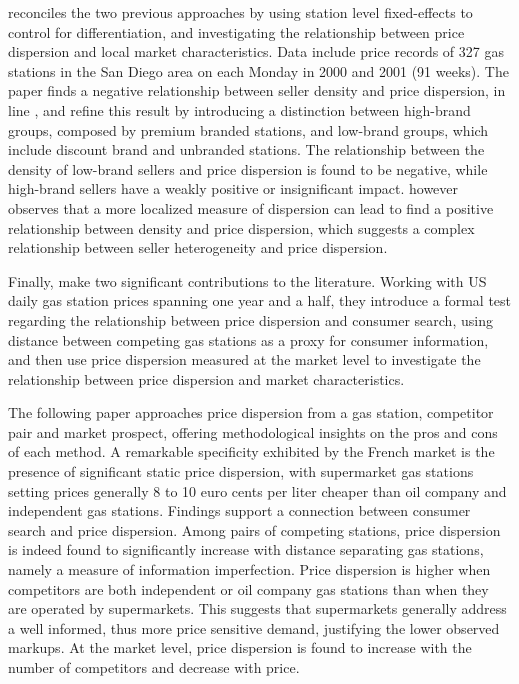 \documentclass[english]{article}
\begin{document}
\cite{LEW08} reconciles the two previous approaches by using station level fixed-effects to control for differentiation, and investigating the relationship between price dispersion and local market characteristics. Data include price records of 327 gas stations in the San Diego area on each Monday in 2000 and 2001 (91 weeks). The paper finds a negative relationship between seller density and price dispersion, in line \cite{BAR04}, and refine this result by introducing a distinction between high-brand groups, composed by premium branded stations, and low-brand groups, which include discount brand and unbranded stations. The relationship between the density of low-brand sellers and price dispersion is found to be negative, while high-brand sellers have a weakly positive or insignificant impact. \cite{LEW08} however observes that a more localized measure of dispersion can lead to find a positive relationship between density and price dispersion, which suggests a complex relationship between seller heterogeneity and price dispersion.

Finally, \cite{TAP11} make two significant contributions to the literature. Working with US daily gas station prices spanning one year and a half, they introduce a formal test regarding the relationship between price dispersion and consumer search, using distance between competing gas stations as a proxy for consumer information, and then use price dispersion measured at the market level to investigate the relationship between price dispersion and market characteristics.

The following paper approaches price dispersion from a gas station, competitor pair and market prospect, offering methodological insights on the pros and cons of each method. A remarkable specificity exhibited by the French market is the presence of significant static price dispersion, with supermarket gas stations setting prices generally 8 to 10 euro cents per liter cheaper than oil company and independent gas stations. Findings support a connection between consumer search and price dispersion. Among pairs of competing stations, price dispersion is indeed found to significantly increase with distance separating gas stations, namely a measure of information imperfection. Price dispersion is higher when competitors are both independent or oil company gas stations than when they are operated by supermarkets. This suggests that supermarkets generally address a well informed, thus more price sensitive demand, justifying the lower observed markups. At the market level, price dispersion is found to increase with the number of competitors and decrease with price.
\end{document}

